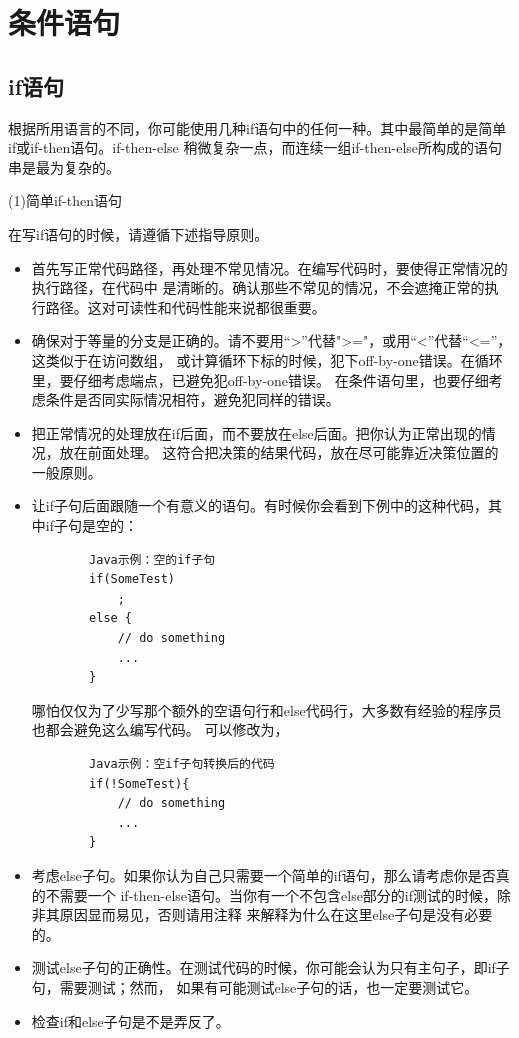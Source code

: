\documentclass{article}
\begin{document}
\section{条件语句}
\subsection{if语句}
根据所用语言的不同，你可能使用几种if语句中的任何一种。其中最简单的是简单if或if-then语句。if-then-else
稍微复杂一点，而连续一组if-then-else所构成的语句串是最为复杂的。
\par
(1)简单if-then语句
\par
在写if语句的时候，请遵循下述指导原则。
\begin{itemize}
    \item 首先写正常代码路径，再处理不常见情况。在编写代码时，要使得正常情况的执行路径，在代码中
    是清晰的。确认那些不常见的情况，不会遮掩正常的执行路径。这对可读性和代码性能来说都很重要。
    \item 确保对于等量的分支是正确的。请不要用“>”代替">="，或用“<”代替“<=”，这类似于在访问数组，
    或计算循环下标的时候，犯下off-by-one错误。在循环里，要仔细考虑端点，已避免犯off-by-one错误。
    在条件语句里，也要仔细考虑条件是否同实际情况相符，避免犯同样的错误。
    \item 把正常情况的处理放在if后面，而不要放在else后面。把你认为正常出现的情况，放在前面处理。
    这符合把决策的结果代码，放在尽可能靠近决策位置的一般原则。
    \item 让if子句后面跟随一个有意义的语句。有时候你会看到下例中的这种代码，其中if子句是空的：
    \begin{lstlisting}
        Java示例：空的if子句
        if(SomeTest)
            ;
        else {
            // do something
            ...
        }
    \end{lstlisting}
    哪怕仅仅为了少写那个额外的空语句行和else代码行，大多数有经验的程序员也都会避免这么编写代码。
    可以修改为，
    \begin{lstlisting}
        Java示例：空if子句转换后的代码
        if(!SomeTest){
            // do something
            ...
        }
    \end{lstlisting}
    \item 考虑else子句。如果你认为自己只需要一个简单的if语句，那么请考虑你是否真的不需要一个
    if-then-else语句。当你有一个不包含else部分的if测试的时候，除非其原因显而易见，否则请用注释
    来解释为什么在这里else子句是没有必要的。
    \item 测试else子句的正确性。在测试代码的时候，你可能会认为只有主句子，即if子句，需要测试；然而，
    如果有可能测试else子句的话，也一定要测试它。
    \item 检查if和else子句是不是弄反了。
\end{itemize}
\end{document}

